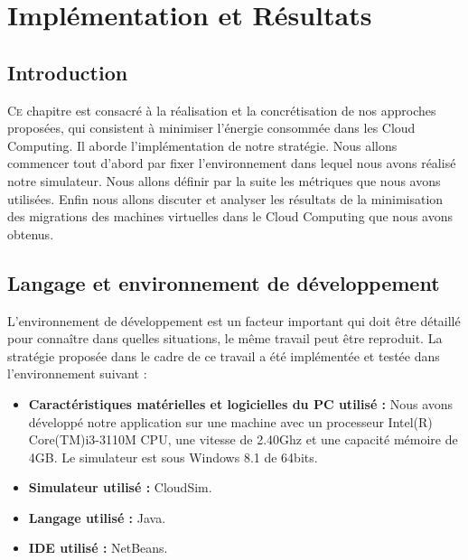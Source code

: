 \chapter{Implémentation et Résultats}
\vspace{3cm}
\minitoc
\clearpage

\label{Chapitre4}

\section{Introduction}
\begin{onehalfspace}
\lettrine[nindent=1em,lines=3]{C}e chapitre est consacré à la réalisation et la concrétisation de nos approches proposées, qui consistent à minimiser l’énergie consommée  dans les  Cloud Computing. Il  aborde l’implémentation de notre stratégie. Nous allons commencer tout  d’abord par fixer l’environnement dans lequel nous avons réalisé notre simulateur. Nous allons définir par la suite  les métriques que nous avons utilisées. Enfin nous allons discuter  et analyser les résultats de la minimisation des migrations des machines virtuelles dans le Cloud Computing que nous avons obtenus.

\end{onehalfspace}
\section{Langage et environnement de développement}
\begin{onehalfspace}
L'environnement de développement est un facteur important qui doit être détaillé pour connaître dans quelles situations, le même travail peut être reproduit. La stratégie proposée dans le cadre de ce travail a été implémentée et testée dans l'environnement suivant :\medskip

\begin{itemize}
\item \textbf{Caractéristiques matérielles et logicielles du PC utilisé :} Nous avons développé notre application sur une machine avec un processeur Intel(R) Core(TM)i3-3110M CPU, une vitesse de 2.40Ghz et une capacité mémoire de 4GB. Le simulateur est  sous Windows 8.1 de 64bits.
\item \textbf{Simulateur utilisé :} CloudSim.
\item \textbf{Langage utilisé :} Java.
\item \textbf{IDE utilisé :} NetBeans.
\end{itemize}
\end{onehalfspace}
